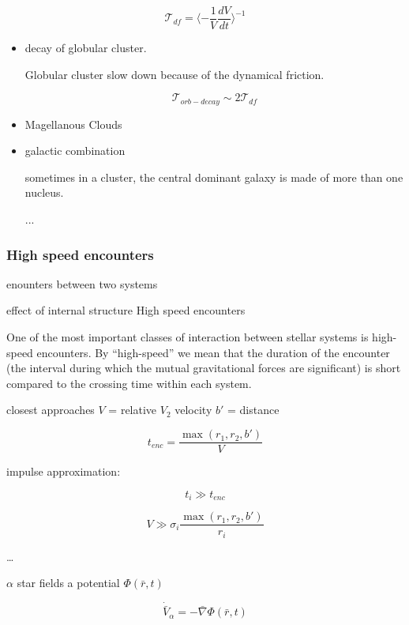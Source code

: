 $$
\mathcal T_{df} = \langle - \dfrac{1}{V} \dfrac{d V}{dt} \rangle^{-1}
$$

\begin{advancedblock}[Applications]

\begin{itemize}

    \item decay of globular cluster.
    
    Globular cluster slow down because of the dynamical friction.

    $$
    \mathcal T_{orb-decay} \sim 2 \mathcal T_{df}
    $$
    
    \item Magellanous Clouds
    
    \item galactic combination

    sometimes in a cluster, the central dominant galaxy is made of more than one nucleus.
    
    ...
    
\end{itemize}
\end{advancedblock}

\subsubsection{High speed encounters}

enounters 
between two systems

effect of internal structure
High speed encounters

One of the most important classes of interaction between stellar systems is high-speed encounters. By “high-speed” we mean that the duration of the encounter (the interval during which the mutual gravitational forces are significant) is short compared to the crossing time within each system.

closest approaches
$V$ = relative $V_2$ velocity
$b'$ = distance

$$
t_{enc} = \dfrac{\max(r_1, r_2, b')}{V}
$$

impulse approximation:

$$
t_i \gg t_{enc}
$$

$$
V \gg \sigma_i \dfrac{\max(r_1, r_2, b')}{r_i}
$$

\dots

$\alpha$ star fields a potential $\Phi (\bar r, t)$ 

$$
\dot \bar V_\alpha = - \bar \nabla \Phi (\bar r, t)
$$

